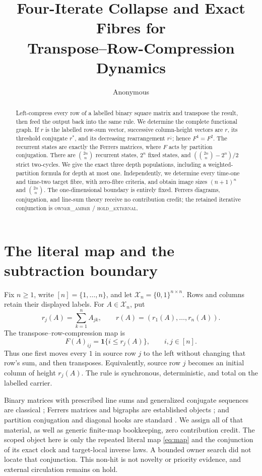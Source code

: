 \documentclass[a4paper,10pt]{amsart}
\title[Transpose--row-compression dynamics]{Four-Iterate Collapse and Exact Fibres for\\
Transpose--Row-Compression Dynamics}
\author{Anonymous}
\date{}
\theoremstyle{remark}
\newcommand{\X}{\mathcal X}
\begin{document}
\begin{abstract}
Left-compress every row of a labelled binary square matrix and transpose the
result, then feed the output back into the same rule.  We determine the
complete functional graph.  If $r$ is the labelled row-sum vector, successive
column-height vectors are $r$, its threshold conjugate $r^*$, and its
decreasing rearrangement $r^\downarrow$; hence $F^4=F^2$.  The recurrent
states are exactly the Ferrers matrices, where $F$ acts by partition
conjugation.  There are $\binom{2n}{n}$ recurrent states, $2^n$ fixed states,
and $(\binom{2n}{n}-2^n)/2$ strict two-cycles.  We give the exact three depth
populations, including a weighted-partition formula for depth at most one.
Independently, we determine every time-one and time-two target fibre, with
zero-fibre criteria, and obtain image sizes $(n+1)^n$ and $\binom{2n}{n}$.
The one-dimensional boundary is entirely fixed.  Ferrers diagrams,
conjugation, and line-sum theory receive no contribution credit; the retained
iterative conjunction is \textsc{owner\_amber / hold\_external}.
\end{abstract}

\maketitle

\section{The literal map and the subtraction boundary}

Fix $n\geq1$, write $[n]=\{1,\ldots,n\}$, and let
$\X_n=\{0,1\}^{n\times n}$.  Rows and columns retain their displayed labels.
For $A\in\X_n$, put
\[
 r_j(A)=\sum_{k=1}^n A_{jk},\qquad
 r(A)=(r_1(A),\ldots,r_n(A)).
\]
The transpose--row-compression map is
\begin{equation}\label{eq:map}
 F(A)_{ij}=\mathbf1\{i\leq r_j(A)\},\qquad i,j\in[n].
\end{equation}
Thus one first moves every $1$ in source row $j$ to the left without changing
that row's sum, and then transposes.  Equivalently, source row $j$ becomes an
initial column of height $r_j(A)$.  The rule is synchronous, deterministic,
and total on the labelled carrier.

Binary matrices with prescribed line sums and generalized conjugate
sequences are classical \cite{Miller2013,KouteckyOnn2020}; Ferrers matrices
and bigraphs are established objects \cite{DasDasSen2016}; and partition
conjugation and diagonal hooks are standard \cite{Andrews1998}.  We assign
all of that material, as well as generic finite-map bookkeeping, zero
contribution credit.  The scoped object here is only the repeated literal map
\eqref{eq:map} and the conjunction of its exact clock and target-local inverse
laws.  A bounded owner search did not locate that conjunction.  This non-hit
is not novelty or priority evidence, and external circulation remains on
hold.
\end{document}
